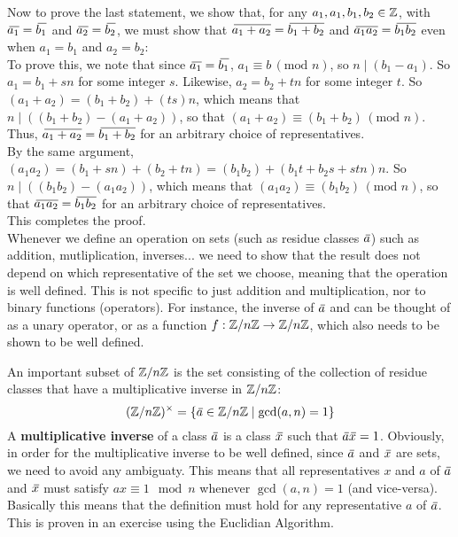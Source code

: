 \documentclass[12pt]{article}
\begin{document}
    Now to prove the last statement,
    we show that, for any $a_1, a_1, b_1, b_2 \in \mathbb{Z}$,
    with $\,\overline{\!{a_1}} = \,\overline{\!{b_1}}$ and  $\,\overline{\!{a_2}} = \,\overline{\!{b_2}}$,
    we must show that $\,\overline{\!{a_1 + a_2}} = \,\overline{\!{b_1 + b_2}}$
    and  $\,\overline{\!{a_1a_2}} = \,\overline{\!{b_1b_2}}$
    even when $a_1 = b_1$ and $a_2 = b_2$: \\
    To prove this, we note that since $\,\overline{\!{a_1}} = \,\overline{\!{b_1}}$,
    $a_1 \equiv b \, (\text{mod } n)$,
    so $n \mid (b_1 - a_1)$. So $a_1 = b_1 + sn$ for some integer $s$.
    Likewise, $a_2 = b_2 + tn$ for some integer $t$.
    So $(a_1 + a_2) = (b_1 + b_2) + (ts)n$,
    which means that $n \mid ((b_1 + b_2) - (a_1 + a_2))$,
    so that $(a_1 + a_2) \equiv (b_1 + b_2) \, (\text{mod } n)$.
    Thus, $\,\overline{\!{a_1 + a_2}} = \,\overline{\!{b_1 + b_2}}$ for an arbitrary
    choice of representatives. \\
    By the same argument,
    $(a_1a_2) = (b_1 + sn) + (b_2 + tn) = (b_1b_2) + (b_1t+b_2s + stn)n$.
    So $n \mid ((b_1b_2) - (a_1a_2))$,
    which means that $(a_1a_2) \equiv (b_1b_2) \, (\text{mod } n)$,
    so that $\,\overline{\!{a_1a_2}} = \,\overline{\!{b_1b_2}}$ for an arbitrary
    choice of representatives. \\
    This completes the proof. \\

    Whenever we define an operation on sets
    (such as residue classes $\,\overline{\!{a}}$)
    such as addition, mutliplication, inverses...
    we need to show that the result does not depend on which
    representative of the set we choose,
    meaning that the operation is well defined.
    This is not specific to just addition and multiplication,
    nor to binary functions (operators).
    For instance, the inverse of $\,\overline{\!{a}}$
    and can be thought of as a unary operator,
    or as a function $f: \mathbb{Z}/n\mathbb{Z} \to \mathbb{Z}/n\mathbb{Z}$,
    which also needs to be shown to be well defined.

    An important subset of $\mathbb{Z}/n\mathbb{Z}$
    is the set consisting of the collection of residue classes
    that have a multiplicative inverse in $\mathbb{Z}/n\mathbb{Z}$:
    \[ (\mathbb{Z}/n\mathbb{Z})^\times
    = \{ \,\overline{\!{a}} \in \mathbb{Z}/n\mathbb{Z} \mid \text{gcd}(a, n) = 1 \} \]
    A \textbf{multiplicative inverse} of a class $\,\overline{\!{a}}$
    is a class $\,\overline{\!{x}}$ such that $\,\overline{\!{a}}\,\overline{\!{x}} = 1$.
    Obviously, in order for the multiplicative
    inverse to be well defined,
    since $\,\overline{\!{a}}$ and $\,\overline{\!{x}}$ are sets,
    we need to avoid any ambiguaty.
    This means that all representatives
    $x$ and $a$ of $\,\overline{\!{a}}$ and $\,\overline{\!{x}}$
    must satisfy $ax \equiv 1 \mod n$
    whenever $\gcd(a, n) = 1$
    (and vice-versa).
    Basically this means that the definition must hold
    for any representative $a$ of $\,\overline{\!{a}}$. \\
    This is proven in an exercise using the Euclidian Algorithm. \\
    
\end{document}
